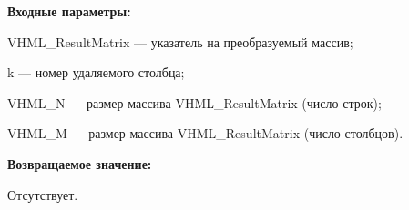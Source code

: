 \textbf{Входные параметры:}  
 
VHML\_ResultMatrix --- указатель на преобразуемый массив;
 
k --- номер удаляемого столбца;
 
VHML\_N --- размер массива VHML\_ResultMatrix (число строк);
 
VHML\_M --- размер массива VHML\_ResultMatrix (число столбцов).

\textbf{Возвращаемое значение:}

Отсутствует.